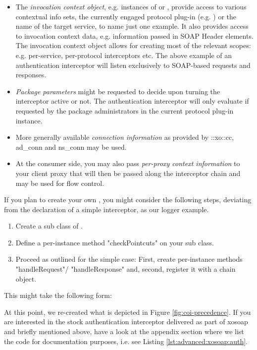 \begin{itemize}
\item The \emph{invocation context object}, e.g. instances of  or , provide access to various contextual info sets, the currently engaged protocol plug-in (e.g. ) or the name of the target service, to name just one example. It also provides access to invocation context data, e.g. information passed in SOAP Header elements. The invocation context object allows for creating most of the relevant scopes: e.g. per-service, per-protocol interceptors etc. The above example of an authentication interceptor will listen exclusively to SOAP-based requests and responses.
\item \emph{Package parameters} might be requested to decide upon turning the interceptor active or not. The authentication interceptor will only evaluate if requested by the package administrators in the current protocol plug-in instance.
\item More generally available \emph{connection information} as provided by ::xo::cc, ad\_conn and ns\_conn may be used.
\item At the consumer side, you may also pass \emph{per-proxy context information} to your client proxy that will then be passed along the interceptor chain and may be used for flow control.
\end{itemize}
If you plan to create your own , you might consider the following steps, deviating from the declaration of a simple interceptor, as our logger example.
\begin{enumerate}
\item Create a sub class of .
\item Define a per-instance method "checkPointcuts" on your sub class.
\item Proceed as outlined for the simple case: First, create per-instance methods "handleRequest"/ "handleResponse" and, second, register it with a chain object.
\end{enumerate}
This might take the following form:
%
\lstset{breaklines=true,numbers=left,basicstyle=\footnotesize,frame=single}

%
At this point, we re-created what is depicted in Figure \ref{fig:coi-precedence}. If you are interested in the stock authentication interceptor delivered as part of xosoap and briefly mentioned above, have a look at the appendix section where we list the code for documentation purposes, i.e. see Listing \ref{lst:advanced:xosoap:auth}.
